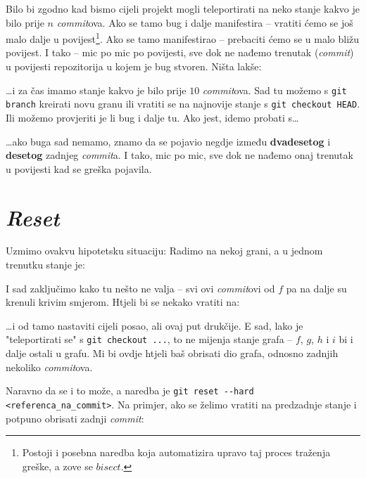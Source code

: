 Bilo bi zgodno kad bismo cijeli projekt mogli teleportirati na neko stanje kakvo je bilo prije $n$ \emph{commit}ova.
Ako se tamo bug i dalje manifestira -- vratiti ćemo se još malo dalje u povijest\footnote{Postoji i posebna naredba koja automatizira upravo taj proces traženja greške, a zove se $bisect$.}.
Ako se tamo manifestirao -- prebaciti ćemo se u malo bližu povijest.
I tako -- mic po mic po povijesti, sve dok ne nađemo trenutak (\emph{commit}) u povijesti repozitorija u kojem je bug stvoren.
Ništa lakše:


\dots{}i za čas imamo stanje kakvo je bilo prije $10$ \emph{commit}ova. Sad tu možemo s \verb+git branch+ kreirati novu granu ili vratiti se na najnovije stanje s \verb+git checkout HEAD+. Ili možemo provjeriti je li bug i dalje tu. Ako jest, idemo probati s\dots


\dots{}ako buga sad nemamo, znamo da se pojavio negdje između \textbf{dvadesetog} i \textbf{desetog} zadnjeg \emph{commit}a.
I tako, mic po mic, sve dok ne nađemo onaj trenutak u povijesti kad se greška pojavila.

\section*{\emph{Reset}}

Uzmimo ovakvu hipotetsku situaciju: Radimo na nekoj grani, a u jednom trenutku stanje je:



I sad zaključimo kako tu nešto ne valja -- svi ovi \emph{commit}ovi od $f$ pa na dalje su krenuli krivim smjerom.
Htjeli bi se nekako vratiti na:



\dots{}i od tamo nastaviti cijeli posao, ali ovaj put drukčije.
E sad, lako je "teleportirati se" s \verb+git checkout ...+, to ne mijenja stanje grafa -- $f$, $g$, $h$ i $i$ bi i dalje ostali u grafu.
Mi bi ovdje htjeli baš obrisati dio grafa, odnosno zadnjih nekoliko \emph{commit}ova.

Naravno da se i to može, a naredba je \verb+git reset --hard <referenca_na_commit>+.
Na primjer, ako se želimo vratiti na predzadnje stanje i potpuno obrisati zadnji \emph{commit}:

